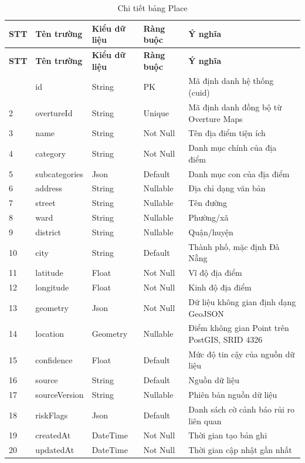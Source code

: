 \begin{longtable}{|p{0.7cm}|p{3.3cm}|p{1.9cm}|p{2.1cm}|p{5.4cm}|}
    \caption{Chi tiết bảng Place}
    \label{tab:db_place} \\
    \hline
    \textbf{STT} & \textbf{Tên trường} & \textbf{Kiểu dữ liệu} & \textbf{Ràng buộc} & \textbf{Ý nghĩa} \\
    \hline
    \endfirsthead
    \hline
    \textbf{STT} & \textbf{Tên trường} & \textbf{Kiểu dữ liệu} & \textbf{Ràng buộc} & \textbf{Ý nghĩa} \\
    \hline
    \endhead
    \hline
    \endfoot
    \hline
    \endlastfoot
    1 & id & String & PK & Mã định danh hệ thống (cuid) \\ \hline
    2 & overtureId & String & Unique & Mã định danh đồng bộ từ Overture Maps \\ \hline
    3 & name & String & Not Null & Tên địa điểm tiện ích \\ \hline
    4 & category & String & Not Null & Danh mục chính của địa điểm \\ \hline
    5 & subcategories & Json & Default & Danh mục con của địa điểm \\ \hline
    6 & address & String & Nullable & Địa chỉ dạng văn bản \\ \hline
    7 & street & String & Nullable & Tên đường \\ \hline
    8 & ward & String & Nullable & Phường/xã \\ \hline
    9 & district & String & Nullable & Quận/huyện \\ \hline
    10 & city & String & Default & Thành phố, mặc định Đà Nẵng \\ \hline
    11 & latitude & Float & Not Null & Vĩ độ địa điểm \\ \hline
    12 & longitude & Float & Not Null & Kinh độ địa điểm \\ \hline
    13 & geometry & Json & Not Null & Dữ liệu không gian định dạng GeoJSON \\ \hline
    14 & location & Geometry & Nullable & Điểm không gian Point trên PostGIS, SRID 4326 \\ \hline
    15 & confidence & Float & Default & Mức độ tin cậy của nguồn dữ liệu \\ \hline
    16 & source & String & Default & Nguồn dữ liệu \\ \hline
    17 & sourceVersion & String & Nullable & Phiên bản nguồn dữ liệu \\ \hline
    18 & riskFlags & Json & Default & Danh sách cờ cảnh báo rủi ro liên quan \\ \hline
    19 & createdAt & DateTime & Not Null & Thời gian tạo bản ghi \\ \hline
    20 & updatedAt & DateTime & Not Null & Thời gian cập nhật gần nhất \\
\end{longtable}
